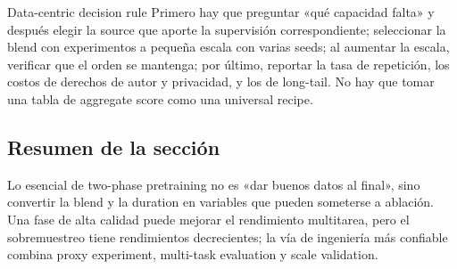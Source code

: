\begin{importantbox}{Data-centric decision rule}
Primero hay que preguntar «qué capacidad falta» y después elegir la source que aporte la supervisión correspondiente; seleccionar la blend con experimentos a pequeña escala con varias seeds; al aumentar la escala, verificar que el orden se mantenga; por último, reportar la tasa de repetición, los costos de derechos de autor y privacidad, y los de long-tail. No hay que tomar una tabla de aggregate score como una universal recipe.
\end{importantbox}

\subsection{Resumen de la sección}

Lo esencial de two-phase pretraining no es «dar buenos datos al final», sino convertir la blend y la duration en variables que pueden someterse a ablación. Una fase de alta calidad puede mejorar el rendimiento multitarea, pero el sobremuestreo tiene rendimientos decrecientes; la vía de ingeniería más confiable combina proxy experiment, multi-task evaluation y scale validation.
